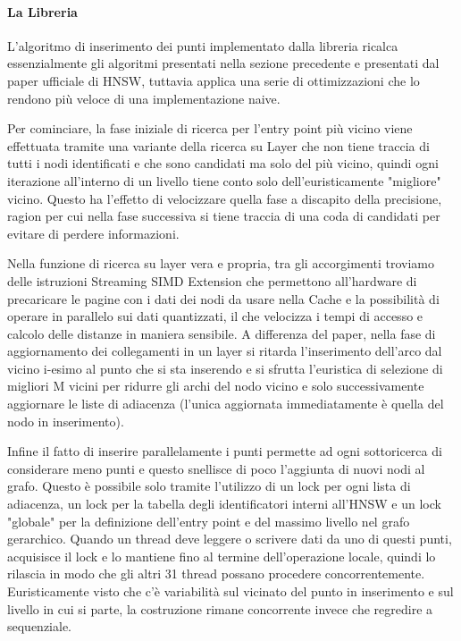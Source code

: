 \paragraph{La Libreria}

L'algoritmo di inserimento dei punti implementato dalla libreria ricalca essenzialmente gli algoritmi presentati nella sezione precedente e presentati dal paper ufficiale di HNSW, tuttavia applica una serie di ottimizzazioni che lo rendono pi\`u veloce di una implementazione naive.

Per cominciare, la fase iniziale di ricerca per l'entry point pi\`u vicino viene effettuata tramite una variante della ricerca su Layer che non tiene traccia di tutti i nodi identificati e che sono candidati ma solo del pi\`u vicino, quindi ogni iterazione all'interno di un livello tiene conto solo dell'euristicamente "migliore" vicino.
Questo ha l'effetto di velocizzare quella fase a discapito della precisione, ragion per cui nella fase successiva si tiene traccia di una coda di candidati per evitare di perdere informazioni.

Nella funzione di ricerca su layer vera e propria, tra gli accorgimenti troviamo delle istruzioni Streaming SIMD Extension che permettono all'hardware di precaricare le pagine con i dati dei nodi da usare nella Cache e la possibilit\`a di operare in parallelo sui dati quantizzati, il che velocizza i tempi di accesso e calcolo delle distanze in maniera sensibile.
A differenza del paper, nella fase di aggiornamento dei collegamenti in un layer si ritarda l'inserimento dell'arco dal vicino i-esimo al punto che si sta inserendo e si sfrutta l'euristica di selezione di migliori M vicini per ridurre gli archi del nodo vicino e solo successivamente aggiornare le liste di adiacenza (l'unica aggiornata immediatamente \`e quella del nodo in inserimento).

Infine il fatto di inserire parallelamente i punti permette ad ogni sottoricerca di considerare meno punti e questo snellisce di poco l'aggiunta di nuovi nodi al grafo.
Questo \`e possibile solo tramite l'utilizzo di un lock per ogni lista di adiacenza, un lock per la tabella degli identificatori interni all'HNSW e un lock "globale" per la definizione dell'entry point e del massimo livello nel grafo gerarchico.
Quando un thread deve leggere o scrivere dati da uno di questi punti, acquisisce il lock e lo mantiene fino al termine dell'operazione locale, quindi lo rilascia in modo che gli altri 31 thread possano procedere concorrentemente.
Euristicamente visto che c'\`e variabilit\`a sul vicinato del punto in inserimento e sul livello in cui si parte, la costruzione rimane concorrente invece che regredire a sequenziale.


